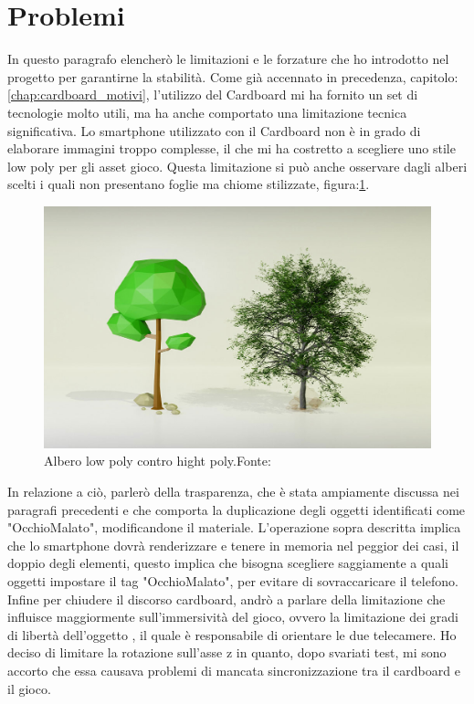 \documentclass[
a4paper,
cleardoublepage=empty,
headings=twolinechapter,
numbers=autoenddot,
]{scrbook}
\begin{document}
	\section{Problemi}
	In questo paragrafo elencherò le limitazioni e le forzature che ho introdotto nel progetto per garantirne la stabilità. Come già accennato in precedenza, capitolo:\ref{chap:cardboard_motivi}, l'utilizzo del Cardboard mi ha fornito un set di tecnologie molto utili, ma ha anche comportato una limitazione tecnica significativa. Lo smartphone utilizzato con il Cardboard non è in grado di elaborare immagini troppo complesse, il che mi ha costretto a scegliere uno stile low poly per gli asset  gioco.
	Questa limitazione si può anche osservare dagli alberi scelti i quali non presentano foglie ma chiome stilizzate, figura:\ref{fig:low_hight}.
	\begin{figure}[H]
		\centering
		\includegraphics[width=0.6\linewidth]{image/low_hight}
		\caption{Albero low poly contro hight poly.Fonte:\cite{low_high}}
		\label{fig:low_hight}
	\end{figure}
	In relazione a ciò, parlerò della trasparenza, che è stata ampiamente discussa nei paragrafi precedenti e che comporta la duplicazione degli oggetti identificati come "OcchioMalato", modificandone il materiale.
	L'operazione sopra descritta implica che lo smartphone dovrà renderizzare e tenere in memoria nel peggior dei casi, il doppio degli elementi, questo implica che bisogna scegliere saggiamente a quali oggetti impostare il tag "OcchioMalato", per evitare di sovraccaricare il telefono.
	Infine per chiudere il discorso cardboard, andrò a parlare della limitazione che influisce maggiormente sull'immersività del gioco, ovvero la limitazione dei gradi di libertà dell'oggetto , il quale è responsabile di orientare le due telecamere.
	Ho deciso di limitare la rotazione sull'asse z in quanto, dopo svariati test, mi sono accorto che essa causava problemi di mancata sincronizzazione tra il cardboard e il gioco.\\\\
\end{document}
